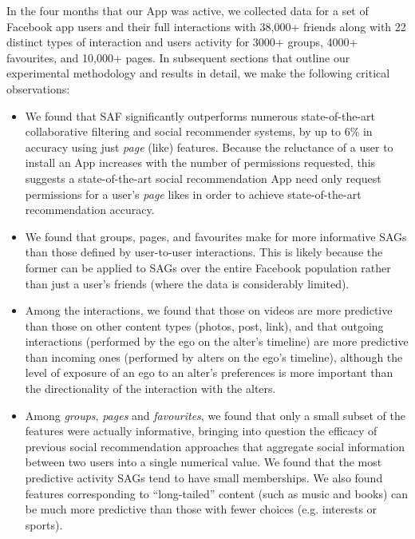 In the four months that our App was active, we collected data for a
set of Facebook app users and their full interactions with 38,000+
friends along with 22 distinct types of interaction and users activity
for 3000+ groups, 4000+ favourites, and 10,000+ pages.  In subsequent
sections that outline our experimental methodology and results in
detail, we make the following critical observations:
\begin{itemize}
\item We found that SAF significantly 
outperforms numerous state-of-the-art collaborative filtering and social recommender 
systems, by up to 6\% in accuracy using just \emph{page} (like) features.
Because the reluctance of a user to install an App increases with the number
of permissions requested, this suggests a state-of-the-art social recommendation App 
need only request permissions for a user's \emph{page} likes in order to achieve
state-of-the-art recommendation accuracy.
\item We found that groups, pages, and favourites make for more informative
SAGs than those defined by user-to-user interactions.  This is likely because the former can be
applied to SAGs over the entire Facebook population 
rather than just a user's friends (where the data is considerably limited).
\item Among the interactions, we found that those on videos are more predictive than those on other content types (photos, post, link), and that outgoing interactions (performed by the ego on the alter's timeline) 
are more predictive than incoming ones (performed by alters on the
ego's timeline), although the level of exposure of an ego to an
alter's preferences is more important than the directionality of the
interaction with the alters.
\item %
Among {\em groups}, {\em pages} and {\em favourites}, we found that only
a small subset of the features were actually informative, bringing into question the efficacy of 
previous social recommendation approaches that aggregate social information between
two users into a single numerical value.  We found that the most  
predictive activity SAGs tend to have small memberships.  We also found features
corresponding to ``long-tailed'' content (such as music and books)
can be much more predictive than those with fewer choices 
(e.g. interests or sports). 
\end{itemize}
